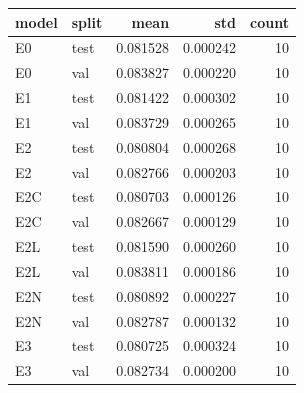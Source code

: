 \begin{tabular}{llrrr}
\toprule
model & split & mean & std & count \\
\midrule
E0 & test & 0.081528 & 0.000242 & 10 \\
E0 & val & 0.083827 & 0.000220 & 10 \\
E1 & test & 0.081422 & 0.000302 & 10 \\
E1 & val & 0.083729 & 0.000265 & 10 \\
E2 & test & 0.080804 & 0.000268 & 10 \\
E2 & val & 0.082766 & 0.000203 & 10 \\
E2C & test & 0.080703 & 0.000126 & 10 \\
E2C & val & 0.082667 & 0.000129 & 10 \\
E2L & test & 0.081590 & 0.000260 & 10 \\
E2L & val & 0.083811 & 0.000186 & 10 \\
E2N & test & 0.080892 & 0.000227 & 10 \\
E2N & val & 0.082787 & 0.000132 & 10 \\
E3 & test & 0.080725 & 0.000324 & 10 \\
E3 & val & 0.082734 & 0.000200 & 10 \\
\bottomrule
\end{tabular}

